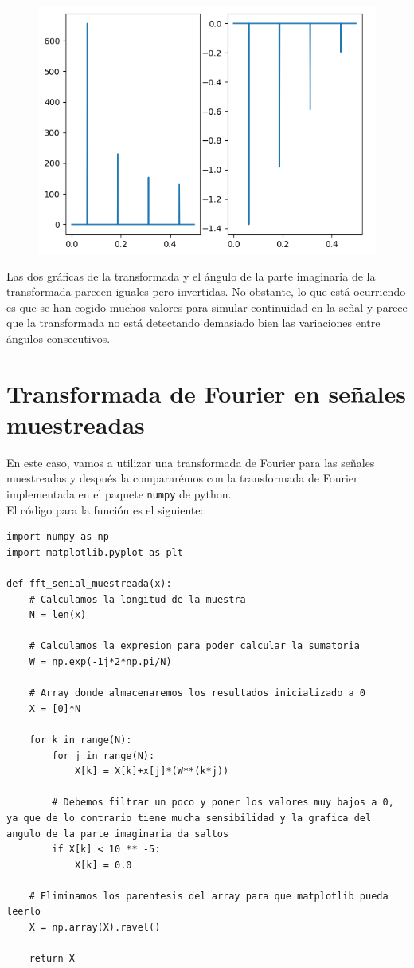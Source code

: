 \documentclass[11pt,a4paper]{article}
\begin{document}
\begin{figure}[H]
	\centering
	\includegraphics[scale=0.55]{img/signal_fft.png}
\end{figure}

Las dos gráficas de la transformada y el ángulo de la parte imaginaria de la transformada parecen iguales pero invertidas. No obstante, lo que está ocurriendo es que se han cogido muchos valores para simular continuidad en la señal y parece que la transformada no está detectando demasiado bien las variaciones entre ángulos consecutivos.

\newpage

\section{Transformada de Fourier en señales muestreadas}

En este caso, vamos a utilizar una transformada de Fourier para las señales muestreadas y después la compararémos con la transformada de Fourier implementada en el paquete \texttt{numpy} de python.\\

El código para la función es el siguiente:

\begin{lstlisting}
import numpy as np
import matplotlib.pyplot as plt

def fft_senial_muestreada(x):
	# Calculamos la longitud de la muestra
    N = len(x)
    
    # Calculamos la expresion para poder calcular la sumatoria
    W = np.exp(-1j*2*np.pi/N)
    
    # Array donde almacenaremos los resultados inicializado a 0
    X = [0]*N

    for k in range(N):
        for j in range(N):
            X[k] = X[k]+x[j]*(W**(k*j))
            
        # Debemos filtrar un poco y poner los valores muy bajos a 0, ya que de lo contrario tiene mucha sensibilidad y la grafica del angulo de la parte imaginaria da saltos
        if X[k] < 10 ** -5:
            X[k] = 0.0

	# Eliminamos los parentesis del array para que matplotlib pueda leerlo
    X = np.array(X).ravel()

    return X
\end{lstlisting}
\end{document}

